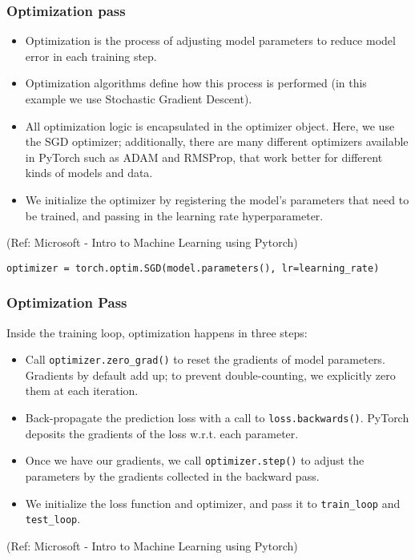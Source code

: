 \begin{frame}[fragile] \frametitle{Optimization pass}


\begin{itemize}
\item Optimization is the process of adjusting model parameters to reduce model error in each training step. 
\item Optimization algorithms define how this process is performed (in this example we use Stochastic Gradient Descent). 
\item All optimization logic is encapsulated in the optimizer object. Here, we use the SGD optimizer; additionally, there are many different optimizers available in PyTorch such as ADAM and RMSProp, that work better for different kinds of models and data.
\item We initialize the optimizer by registering the model's parameters that need to be trained, and passing in the learning rate hyperparameter.
\end{itemize}

\tiny{(Ref: Microsoft - Intro to Machine Learning using Pytorch)}


\begin{lstlisting}
optimizer = torch.optim.SGD(model.parameters(), lr=learning_rate)
\end{lstlisting}

\end{frame}

\begin{frame}[fragile] \frametitle{Optimization Pass}

Inside the training loop, optimization happens in three steps:

\begin{itemize}
\item Call \lstinline|optimizer.zero_grad()| to reset the gradients of model parameters. Gradients by default add up; to prevent double-counting, we explicitly zero them at each iteration.
\item Back-propagate the prediction loss with a call to \lstinline|loss.backwards()|. PyTorch deposits the gradients of the loss w.r.t. each parameter.
\item Once we have our gradients, we call \lstinline|optimizer.step()| to adjust the parameters by the gradients collected in the backward pass.
\item We initialize the loss function and optimizer, and pass it to \lstinline|train_loop| and \lstinline|test_loop|.
\end{itemize}


\tiny{(Ref: Microsoft - Intro to Machine Learning using Pytorch)}
\end{frame}


